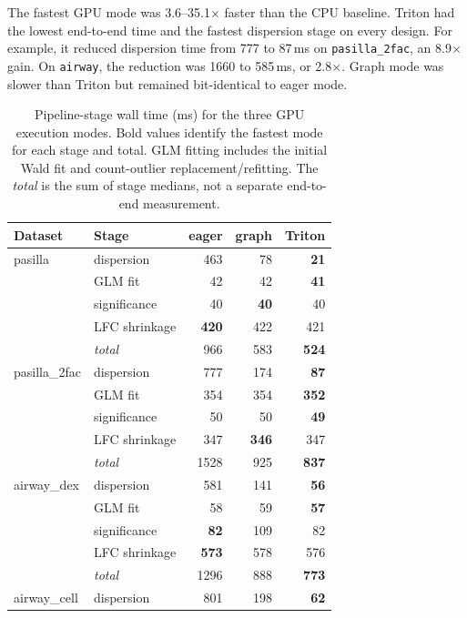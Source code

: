 \documentclass[12pt]{article}
\newcommand{\fact}[1]{#1}
\begin{document}
The fastest GPU mode was \fact{3.6--35.1$\times$} faster than the CPU baseline.
Triton had the lowest end-to-end time and the fastest dispersion stage on every
design. For example, it reduced dispersion time from \fact{777} to \fact{87}\,ms
on \texttt{pasilla\_2fac}, an \fact{8.9$\times$} gain. On \texttt{airway}, the
reduction was \fact{1660} to \fact{585}\,ms, or \fact{2.8$\times$}. Graph mode
was slower than Triton but remained bit-identical to eager mode.

\begin{table}[htbp]\centering
\caption{Pipeline-stage wall time (ms) for the three GPU execution modes.
Bold values identify the fastest mode for each stage and total. GLM fitting
includes the initial Wald fit and count-outlier replacement/refitting. The
\emph{total} is the sum of stage medians, not a separate end-to-end measurement.}
\label{tab:realsubstep}
{\footnotesize
\begin{tabular}{ll@{\hspace{18pt}}rrr}
\toprule
Dataset & Stage & eager & graph & Triton \\\midrule
pasilla & dispersion & 463 & 78 & \textbf{21} \\
        & GLM fit & 42 & 42 & \textbf{41} \\
        & significance & 40 & \textbf{40} & 40 \\
        & LFC shrinkage & \textbf{420} & 422 & 421 \\
        & \emph{total} & 966 & 583 & \textbf{524} \\\midrule
pasilla\_2fac & dispersion & 777 & 174 & \textbf{87} \\
        & GLM fit & 354 & 354 & \textbf{352} \\
        & significance & 50 & 50 & \textbf{49} \\
        & LFC shrinkage & 347 & \textbf{346} & 347 \\
        & \emph{total} & 1528 & 925 & \textbf{837} \\\midrule
airway\_dex & dispersion & 581 & 141 & \textbf{56} \\
        & GLM fit & 58 & 59 & \textbf{57} \\
        & significance & \textbf{82} & 109 & 82 \\
        & LFC shrinkage & \textbf{573} & 578 & 576 \\
        & \emph{total} & 1296 & 888 & \textbf{773} \\\midrule
airway\_cell & dispersion & 801 & 198 & \textbf{62} \\

\end{tabular}}
\end{table}
\end{document}
